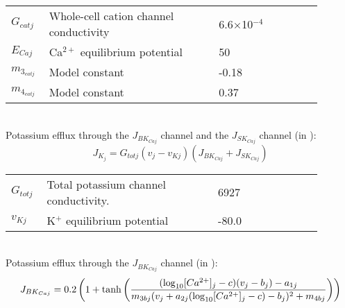 \documentclass[fleqn]{report}
\numberwithin{equation}{section}
\numberwithin{equation}{section}
\begin{document}
							\begin{table}[h!]
							\centering
							\begin{tabular}{ p{0.09\linewidth}  >{\footnotesize} p{0.5\linewidth}  >{\footnotesize} p{0.27\linewidth} >{\footnotesize} p{0.03\linewidth} }
							\hline
							$G_{cat j}$      		& Whole-cell cation channel conductivity						 	& 6.6$\times$10$^{-4}$ \uMpmVs	& \cite{Koenigsberger2006} \\
							$E_{Caj}$      			& Ca$^{2+}$ equilibrium potential								 	& 50 \mV		& \cite{Koenigsberger2006} \\
							
							$m_{3_{catj}}$      	& Model constant				 	& -0.18 \uM		& \cite{Koenigsberger2006} \\
							$m_{4_{catj}}$      	& Model constant					& 0.37  \uM		& \cite{Koenigsberger2006} \\
							\hline
							\end{tabular}
							\label{tab:Jcationj}
							\end{table}
							\\
							Potassium efflux through the $J_{BK_{Caj}}$ channel and the $J_{SK_{Caj}}$ channel (in \uMs):
							\begin{equation} \label{eq:JKj}
							J_{K_{j}} = G_{totj} (v_{j}-v_{Kj}) \left(   J_{BK_{Caj}} + J_{SK_{Caj}} \right) 
							\end{equation}
							\begin{table}[h!]
							\centering
							\begin{tabular}{ p{0.09\linewidth}  >{\footnotesize} p{0.5\linewidth}  >{\footnotesize} p{0.27\linewidth} >{\footnotesize} p{0.03\linewidth} }
							\hline
							$G_{totj}$      		& Total potassium channel conductivity.						 		& 6927 \pS		& \cite{Koenigsberger2006} \\
							$v_{Kj}$      			& K$^{+}$ equilibrium potential					 			 		& -80.0 \mV		& \cite{Koenigsberger2006} \\
							\hline
							\end{tabular}
							\label{tab:JKj}
							\end{table}
							\\
							Potassium efflux through the $J_{BK_{Caj}}$ channel (in \uMs):
							\begin{equation} \label{eq:JBKCAj}
							J_{BK_{Caj}} = 0.2 \left(   1+ \mathrm{tanh}   \left(   \frac{   (\mathrm{log}_{10} [Ca^{2+}]_{j} - c) (v_{j}-b_{j}) - a_{1j}  }   { m_{3bj} ( v_{j} + a_{2j} (\mathrm{log}_{10} [Ca^{2+}]_{j} -c )-b_{j} )^{2} + m_{4bj} }  \right)     \right)  
							\end{equation}
\end{document}
